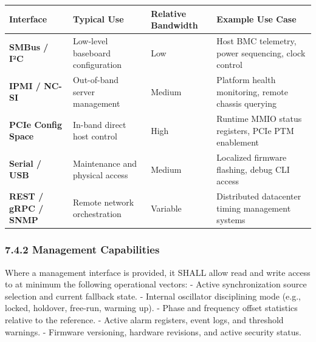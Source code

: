 {\def\LTcaptype{none} %
\begin{longtable}[]{@{}
  >{\raggedright\arraybackslash}p{}
  >{\raggedright\arraybackslash}p{}
  >{\raggedright\arraybackslash}p{}
  >{\raggedright\arraybackslash}p{}@{}}
\toprule\noalign{}
\begin{minipage}[b]{\linewidth}\raggedright
Interface
\end{minipage} & \begin{minipage}[b]{\linewidth}\raggedright
Typical Use
\end{minipage} & \begin{minipage}[b]{\linewidth}\raggedright
Relative Bandwidth
\end{minipage} & \begin{minipage}[b]{\linewidth}\raggedright
Example Use Case
\end{minipage} \\
\midrule\noalign{}
\endhead
\bottomrule\noalign{}
\endlastfoot
\textbf{SMBus / I²C} & Low-level baseboard configuration & Low & Host
BMC telemetry, power sequencing, clock control \\
\textbf{IPMI / NC-SI} & Out-of-band server management & Medium &
Platform health monitoring, remote chassis querying \\
\textbf{PCIe Config Space} & In-band direct host control & High &
Runtime MMIO status registers, PCIe PTM enablement \\
\textbf{Serial / USB} & Maintenance and physical access & Medium &
Localized firmware flashing, debug CLI access \\
\textbf{REST / gRPC / SNMP} & Remote network orchestration & Variable &
Distributed datacenter timing management systems \\
\end{longtable}
}

\subsubsection{7.4.2 Management
Capabilities}\label{management-capabilities}

Where a management interface is provided, it SHALL allow read and write
access to at minimum the following operational vectors: - Active
synchronization source selection and current fallback state. - Internal
oscillator disciplining mode (e.g., locked, holdover, free-run, warming
up). - Phase and frequency offset statistics relative to the reference.
- Active alarm registers, event logs, and threshold warnings. - Firmware
versioning, hardware revisions, and active security status.


